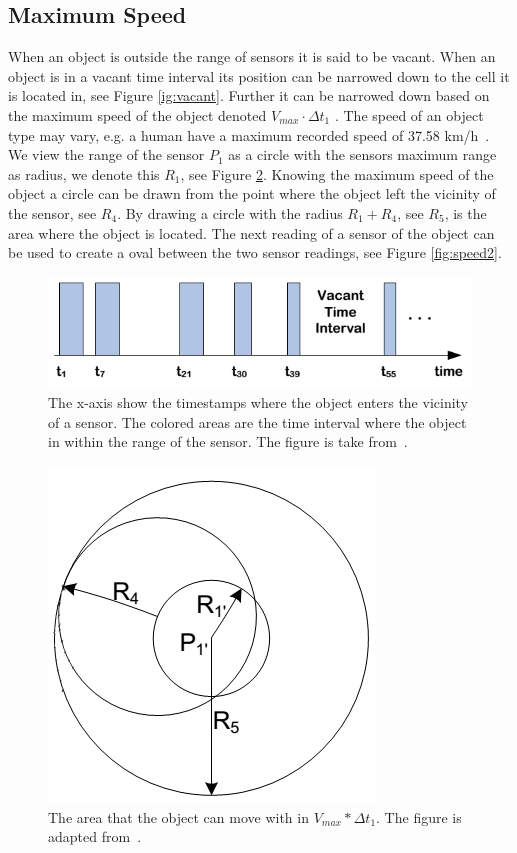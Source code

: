 \subsection{Maximum Speed}
\label{sec:speed}
When an object is outside the range of sensors it is said to be vacant.
When an object is in a vacant time interval its position can be narrowed down to the cell it is located in, see Figure \ref{ig:vacant}. 
Further it can be narrowed down based on the maximum speed of the object denoted $V_{max}\cdot\Delta t_1$ . 
The speed of an object type may vary, e.g. a human have a maximum recorded speed of 37.58 km/h~\cite{bolt}.
We view the range of the sensor $P_1$ as a circle with the sensors maximum range as radius, we denote this $R_1$, see Figure \ref{fig:speed1}.
Knowing the maximum speed of the object a circle can be drawn from the point where the object left the vicinity of the sensor, see $R_4$.
By drawing a circle with the radius $R_1 + R_4$, see $R_5$, is the area where the object is located. 
The next reading of a sensor of the object can be used to create a oval between the two sensor readings, see Figure \ref{fig:speed2}.  

\begin{figure}%
\centering
\includegraphics[width=\columnwidth]{images/vacant.png}%
\caption{The x-axis show the timestamps where the object enters the vicinity of a sensor. The colored areas are the time interval where the object in within the range of the sensor. The figure is take from~\cite{Jensen:2009:GMB:1590953.1591000}.}%
\label{fig:vacant}%
\end{figure}

\begin{figure}%
\centering
\includegraphics[width=0.5\columnwidth]{images/speed.png}%
\caption{The area that the object can move with in $V_{max}*\Delta t_1$. The figure is adapted from~\cite{Jensen:2009:GMB:1590953.1591000}.}%
\label{fig:speed1}%
\end{figure}

